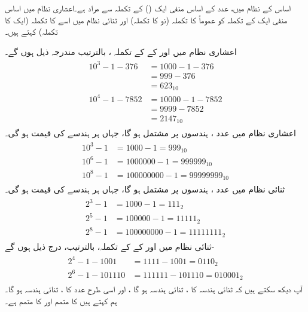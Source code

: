اساس   کے نظام    میں،    عدد  کے اساس منفی ایک ()  کے تکملہ  سے مراد     ہے۔اعشاری نظام میں اساس منفی ایک کے   تکملہ کو عموماً  کا تکملہ (نو کا تکملہ)       اور ثنائی نظام  میں اسے     کا تکملہ    (ایک کا تکملہ) کہتے ہیں۔
 
اعشاری نظام میں    اور    کے   کے تکملہ ،  بالترتیب   مندرجہ ذیل ہوں گے۔ 
\begin{gather}
\begin{aligned}
10^3-1-376&=1000-1-376\\
&=999-376\\
&=623_{10}\\
10^4-1-7852&=10000-1-7852\\
&=9999-7852\\
&=2147_{10}
\end{aligned}
\end{gather}
اعشاری نظام میں عدد    ،      ہندسوں پر مشتمل ہو گا،  جہاں ہر ہندسے کی قیمت    ہو گی۔
\begin{gather}
\begin{aligned}
10^3-1&=1000-1=999_{10}\\
10^6-1&=1000000-1=999999_{10}\\
10^8-1&=100000000-1=99999999_{10}
\end{aligned}
\end{gather}
ثنائی  نظام میں عدد    ،      ہندسوں پر مشتمل ہو گا،  جہاں ہر ہندسے کی قیمت    ہو گی۔
\begin{gather}
\begin{aligned}
2^3-1&=1000-1=111_{2}\\
2^5-1&=100000-1=11111_{2}\\
2^8-1&=100000000-1=11111111_{2}
\end{aligned}
\end{gather}
 ثنائی نظام میں   اور      کے    کے تکملہ، بالترتیب، درج ذیل ہوں گے- 
\begin{gather}
\begin{aligned}
2^4-1-1001&=1111-1001=0110_2\\
2^6-1-101110&=111111-101110=010001_2
\end{aligned}
\end{gather}
آپ دیکھ سکتے ہیں کہ ثنائی ہندسہ    کا ،   ثنائی ہندسہ    ہو گا  ، اور اسی طرح عدد   کا    ،  ثنائی ہندسہ  ہو گا۔ ہم کہتے ہیں  کا متمم  اور  کا متمم  ہے۔

